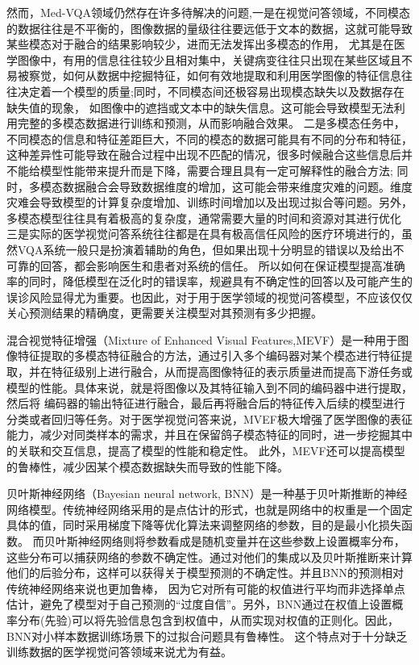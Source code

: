 然而，Med-VQA领域仍然存在许多待解决的问题,一是在视觉问答领域，不同模态的数据往往是不平衡的，图像数据的量级往往要远低于文本的数据，这就可能导致某些模态对于融合的结果影响较少，进而无法发挥出多模态的作用，
尤其是在医学图像中，有用的信息往往较少且相对集中，关键病变往往只出现在某些区域且不易被察觉，如何从数据中挖掘特征，如何有效地提取和利用医学图像的特征信息往往决定着一个模型的质量;同时，不同模态间还极容易出现模态缺失以及数据存在缺失值的现象，
如图像中的遮挡或文本中的缺失信息。这可能会导致模型无法利用完整的多模态数据进行训练和预测，从而影响融合效果。
二是多模态任务中，不同模态的信息和特征差距巨大，不同的模态的数据可能具有不同的分布和特征，这种差异性可能导致在融合过程中出现不匹配的情况，很多时候融合这些信息后并不能给模型性能带来提升而是下降，需要合理且具有一定可解释性的融合方法\cite{huang2021makes};
同时，多模态数据融合会导致数据维度的增加，这可能会带来维度灾难的问题。维度灾难会导致模型的计算复杂度增加、训练时间增加以及出现过拟合等问题。另外，多模态模型往往具有着极高的复杂度，通常需要大量的时间和资源对其进行优化
三是实际的医学视觉问答系统往往都是在具有极高信任风险的医疗环境进行的，虽然VQA系统一般只是扮演着辅助的角色，但如果出现十分明显的错误以及给出不可靠的回答，都会影响医生和患者对系统的信任。
所以如何在保证模型提高准确率的同时，降低模型在泛化时的错误率，规避具有不确定性的回答以及可能产生的误诊风险显得尤为重要。也因此，对于用于医学领域的视觉问答模型，不应该仅仅关心预测结果的精确度，更需要关注模型对其预测有多少把握。

混合视觉特征增强（Mixture of Enhanced Visual Features,MEVF）是一种用于图像特征提取的多模态特征融合的方法，通过引入多个编码器对某个模态进行特征提取，并在特征级别上进行融合，从而提高图像特征的表示质量进而提高下游任务或模型的性能。具体来说，就是将图像以及其特征输入到不同的编码器中进行提取，然后将
编码器的输出特征进行融合，最后再将融合后的特征传入后续的模型进行分类或者回归等任务。对于医学视觉问答来说，MVEF极大增强了医学图像的表征能力，减少对同类样本的需求，并且在保留鸽子模态特征的同时，进一步挖掘其中的关联和交互信息，提高了模型的性能和稳定性。
此外，MEVF还可以提高模型的鲁棒性，减少因某个模态数据缺失而导致的性能下降。

贝叶斯神经网络（Bayesian neural network, BNN）是一种基于贝叶斯推断的神经网络模型。传统神经网络采用的是点估计的形式，也就是网络中的权重是一个固定具体的值，同时采用梯度下降等优化算法来调整网络的参数，目的是最小化损失函数。
而贝叶斯神经网络则将参数看成是随机变量并在这些参数上设置概率分布，这些分布可以捕获网络的参数不确定性。通过对他们的集成以及贝叶斯推断来计算他们的后验分布，这样可以获得关于模型预测的不确定性。并且BNN的预测相对传统神经网络来说也更加鲁棒，
因为它对所有可能的权值进行平均而非选择单点估计，避免了模型对于自己预测的“过度自信”。另外，BNN通过在权值上设置概率分布(先验)可以将先验信息包含到权值中，从而实现对权值的正则化。因此，BNN对小样本数据训练场景下的过拟合问题具有鲁棒性。
这个特点对于十分缺乏训练数据的医学视觉问答领域来说尤为有益。

